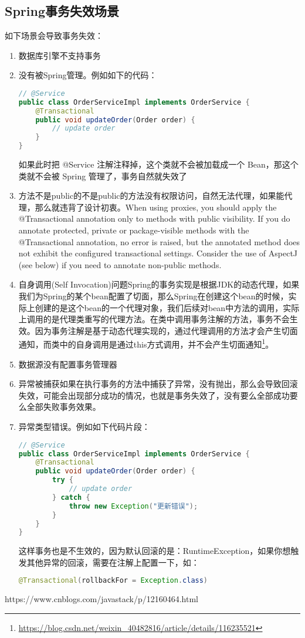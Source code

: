 \documentclass[../../../interview-questions.tex]{subfiles}
\begin{document}
\subsection{Spring事务失效场景}

如下场景会导致事务失效：

\begin{enumerate}
    \item {数据库引擎不支持事务}
    \item {没有被Spring管理。}例如如下的代码：
    
\begin{lstlisting}[language=Java]
// @Service
public class OrderServiceImpl implements OrderService {
    @Transactional
    public void updateOrder(Order order) {
        // update order
    }
}
\end{lstlisting}

    如果此时把 @Service 注解注释掉，这个类就不会被加载成一个 Bean，那这个类就不会被 Spring 管理了，事务自然就失效了

    \item {方法不是public的}不是public的方法没有权限访问，自然无法代理，如果能代理，那么就违背了设计初衷。When using proxies, you should apply the @Transactional annotation only to methods with public visibility. If you do annotate protected, private or package-visible methods with the @Transactional annotation, no error is raised, but the annotated method does not exhibit the configured transactional settings. Consider the use of AspectJ (see below) if you need to annotate non-public methods.
    \item {自身调用(Self Invocation)问题}Spring的事务实现是根据JDK的动态代理，如果我们为Spring的某个bean配置了切面，那么Spring在创建这个bean的时候，实际上创建的是这个bean的一个代理对象，我们后续对bean中方法的调用，实际上调用的是代理类重写的代理方法。在类中调用事务注解的方法，事务不会生效。因为事务注解是基于动态代理实现的，通过代理调用的方法才会产生切面通知，而类中的自身调用是通过this方式调用，并不会产生切面通知\footnote{\url{https://blog.csdn.net/weixin_40482816/article/details/116235521}}。
    \item {数据源没有配置事务管理器}
    \item {异常被捕获}如果在执行事务的方法中捕获了异常，没有抛出，那么会导致回滚失效，可能会出现部分成功的情况，也就是事务失效了，没有要么全部成功要么全部失败事务效果。
    \item {异常类型错误。}例如如下代码片段：
    
\begin{lstlisting}[language=Java]
// @Service
public class OrderServiceImpl implements OrderService {
    @Transactional
    public void updateOrder(Order order) {
        try {
            // update order
        } catch {
            throw new Exception("更新错误");
        }
    }  
}
\end{lstlisting}

    这样事务也是不生效的，因为默认回滚的是：RuntimeException，如果你想触发其他异常的回滚，需要在注解上配置一下，如：

\begin{lstlisting}[language=Java]
@Transactional(rollbackFor = Exception.class)
\end{lstlisting}

\end{enumerate}

https://www.cnblogs.com/javastack/p/12160464.html
\end{document}
